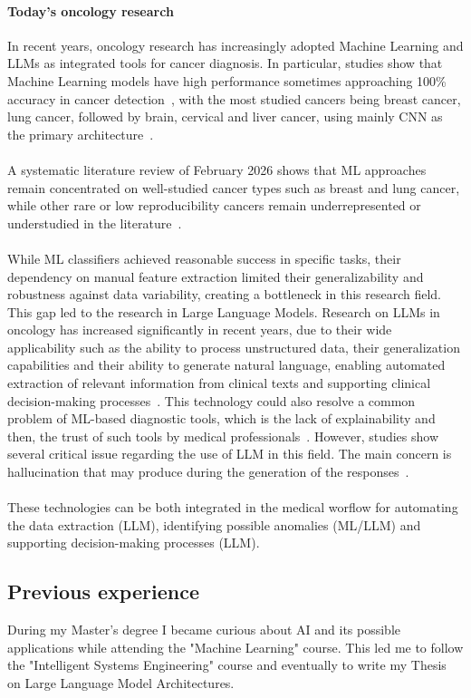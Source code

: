 \documentclass{scrartcl}
\begin{document}
\paragraph{Today's oncology research}{In recent years, oncology research has increasingly adopted Machine Learning and LLMs as integrated tools for cancer diagnosis. In particular, studies show that Machine Learning models have high performance sometimes approaching 100\% accuracy in cancer detection~\cite{Tandon2024}, with the most studied cancers being breast cancer, lung cancer, followed by brain, cervical and liver cancer, using mainly CNN as the primary architecture~\cite{Tandon2024}. 
\\\\
A systematic literature review of February 2026 shows that ML approaches remain concentrated on well-studied cancer types such as breast and lung cancer, while other rare or low reproducibility cancers remain underrepresented or understudied in the literature~\cite{rosca2026}. 
\\\\
While ML classifiers achieved reasonable success in specific tasks, their dependency on manual feature extraction limited their generalizability and robustness against data variability, creating a bottleneck in this research field. This gap led to the research in Large Language Models. Research on LLMs in oncology has increased significantly in recent years, due to their wide applicability such as the ability to process unstructured data, their generalization capabilities and their ability to generate natural language, enabling automated extraction of relevant information from clinical texts and supporting clinical decision-making processes~\cite{rahman2026}. 
This technology could also resolve a common problem of ML-based diagnostic tools, which is the lack of explainability and then, the trust of such tools by medical professionals~\cite{rahman2026}. However, studies show several critical issue regarding the use of LLM in this field. The main concern is hallucination that may produce during the generation of the responses~\cite{rahman2026}.
\\\\
These technologies can be both integrated in the medical worflow for automating the data extraction (LLM), identifying possible anomalies (ML/LLM) and supporting decision-making processes (LLM).}

\subsection{Previous experience}
During my Master's degree I became curious about AI and its possible applications while attending the "Machine Learning" course. This led me to follow the "Intelligent Systems Engineering" course and eventually to write my Thesis on Large Language Model Architectures.
\end{document}

